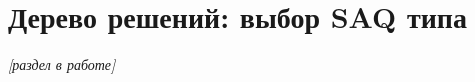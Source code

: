 
\chapter{Дерево решений: выбор SAQ типа}
\label{app:saq-decision-tree}


\textit{[раздел в работе]}
